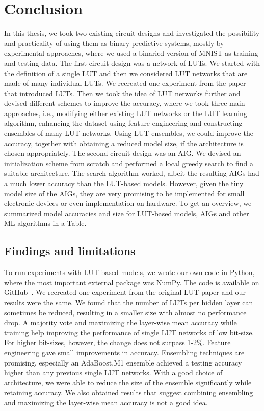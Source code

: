 \section{Conclusion}
In this thesis, we took two existing circuit designs and investigated the possibility and practicality of using them as binary predictive systems, mostly by experimental approaches, where we used a binaried version of MNIST as training and testing data. The first circuit design was a network of LUTs. We started with the definition of a single LUT and then we considered LUT networks that are made of many individual LUTs. We recreated one experiment from the paper that introduced LUTs. Then we took the idea of LUT networks further and devised different schemes to improve the accuracy, where we took three main approaches, i.e., modifying either existing LUT networks or the LUT learning algorithm, enhancing the dataset using feature-engineering and constructing ensembles of many LUT networks. Using LUT ensembles, we could improve the accuracy, together with obtaining a reduced model size, if the architecture is chosen appropriately. The second circuit design was an AIG. We devised an initialization scheme from scratch and performed a local greedy search to find a suitable architecture. The search algorithm worked, albeit the resulting AIGs had a much lower accuracy than the LUT-based models. However, given the tiny model size of the AIGs, they are very promising to be implemented for small electronic devices or even implementation on hardware. To get an overview, we summarized model accuracies and size for LUT-based models, AIGs and other ML algorithms in a Table.


\subsection{Findings and limitations}
To run experiments with LUT-based models, we wrote our own code in Python, where the most important external package was NumPy. The code is available on GitHub~\cite{bib:lut_github}. We recreated one experiment from the original LUT paper \cite{bib:chatterjee2018learning} and our results were the same. We found that the number of LUTs per hidden layer can sometimes be reduced, resulting in a smaller size with almost no performance drop. A majority vote and maximizing the layer-wise mean accuracy while training help improving the performance of single LUT networks of low bit-size. For higher bit-sizes, however, the change does not surpass 1-2\%. Feature engineering gave small improvements in accuracy. Ensembling techniques are promising, especially an AdaBoost.M1 ensemble achieved a testing accuracy higher than any previous single LUT networks. With a good choice of architecture, we were able to reduce the size of the ensemble significantly while retaining accuracy. We also obtained results that suggest combining ensembling and maximizing the layer-wise mean accuracy is not a good idea.

